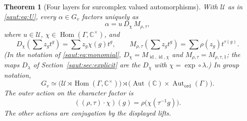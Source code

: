 \documentclass[11pt]{article}
\newtheorem{theorem}{Theorem}[section]
\theoremstyle{definition}
\theoremstyle{remark}
\newcommand{\C}{\mathbb C}
\newcommand{\U}{\mathcal U}
\newcommand{\id}{\operatorname{id}}
\newcommand{\Aut}{\operatorname{Aut}}
\newcommand{\Hom}{\operatorname{Hom}}
\newcommand{\Gh}{\operatorname{Aut}_{\mathrm{ord}}(\Gamma)}
\numberwithin{equation}{section}
\begin{document}
\begin{theorem}[Four layers for surcomplex valued automorphisms]\label{saut:thm:decomp}
With $\U$ as in \eqref{saut:eq:U}, every $\alpha\in G_v$ factors uniquely as
\begin{equation}\label{saut:eq:factor}
 \alpha=u\,D_\chi\,M_{\rho,\tau},
\end{equation}
where $u\in\U$, $\chi\in\Hom(\Gamma,\C^\times)$, and
\[
 D_\chi\left(\sum z_gt^g\right)=\sum z_g\chi(g)t^g,
 \qquad
 M_{\rho,\tau}\left(\sum z_gt^g\right)=\sum\rho(z_g)t^{\tau(g)}.
\]
(In the notation of \eqref{saut:eq:monomial}, $D_\chi=M_{\id,\id,\chi}$ and
$M_{\rho,\tau}=M_{\rho,\tau,1}$; the maps $D_\lambda$ of
Section~\ref{saut:sec:explicit} are the $D_\chi$ with $\chi=\exp\circ\lambda$.)
In group notation,
\begin{equation}\label{saut:eq:fourfactor}
 G_v\simeq
 \bigl(\U\rtimes\Hom(\Gamma,\C^\times)\bigr)
 \rtimes\bigl(\Aut(\C)\times\Gh\bigr).
\end{equation}
The outer action on the character factor is
\begin{equation}\label{saut:eq:charouter}
 ((\rho,\tau)\cdot\chi)(g)=\rho\bigl(\chi(\tau^{-1}g)\bigr).
\end{equation}
The other actions are conjugation by the displayed lifts.
\end{theorem}
\end{document}
